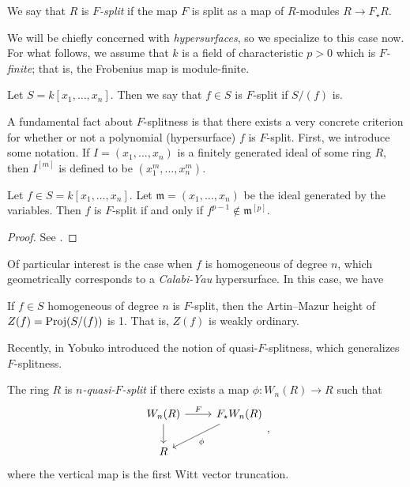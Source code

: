 \begin{defn}
	We say that \(R\) is \textit{\(F\)-split} if the map \(F\) is
	split as a map of 
	\(R\)-modules \(R \xrightarrow{} F_{\star}R\).
\end{defn}

We will be chiefly concerned with \textit{hypersurfaces},
so we specialize to this case now.
For what follows, we assume that \(k\) is a field
of characteristic \(p > 0\) which is 
\textit{\(F\)-finite}; that is, the Frobenius
map is module-finite.

\begin{defn}
	Let \(S = k[x_{1}, \ldots, x_{n}]\).
	Then we say that \(f \in S\) is \(F\)-split if 
	\(S / (f)\) is.
\end{defn}

A fundamental fact about \(F\)-splitness is that there
exists a very concrete criterion for whether or 
not a polynomial (hypersurface) \(f\) is \(F\)-split.
First, we introduce some notation.
If \(I = (x_{1}, \ldots, x_{n})\) is a finitely generated 
ideal of some ring \(R\), 
then \(I^{[m]}\)
is defined to be \((x_{1}^{m}, \ldots, x_{n}^{m})\).

\begin{thm}
    \label{thm:fedder:criterion}
	Let \(f \in S = k[x_{1}, \ldots, x_{n}]\).
	Let \(\mathfrak{m} = (x_{1}, \ldots, x_{n})\) 
	be the ideal generated by the variables.
	Then \(f\) is \(F\)-split if and only if 
	\(f^{p-1} \notin \mathfrak{m}^{[p]}\).
\end{thm}

\begin{proof}
	See \cite[Theorem~2.5]{ma-polstra-2021-F-sing-comm-alg}.
\end{proof}

Of particular interest is the case when \(f\) is 
homogeneous of degree \(n\), which geometrically
corresponds to a \textit{Calabi-Yau} hypersurface.
In this case, we have

\begin{thm}
	\label{thm:fsplit:ordinary}
	If \(f \in S\) 
	homogeneous of degree \(n\) 
	is \(F\)-split,
	then the Artin--Mazur height 
	of \(Z(f) = \operatorname{Proj} (S / (f))\) 
	is 1. That is, \(Z(f)\) is weakly ordinary.
\end{thm}

Recently, in \cite{yobuko-2019-qfs-calabi-yau}
Yobuko introduced the notion of 
quasi-\(F\)-splitness, which generalizes \(F\)-splitness.

\begin{defn}
	The ring \(R\) is \textit{\(n\)-quasi-\(F\)-split} if there exists
	a map \(\phi \colon W_{n}(R) \xrightarrow{} R\) such that
	\[
	\begin{tikzcd}
		W_{n}(R) \arrow{r}{F} \arrow{d}[swap]{} &
		F_{\star}W_{n}(R) \arrow{ld}{\phi} \\
	R 
	\end{tikzcd}
	,\]
	where the vertical map is the first Witt vector truncation.
\end{defn}

